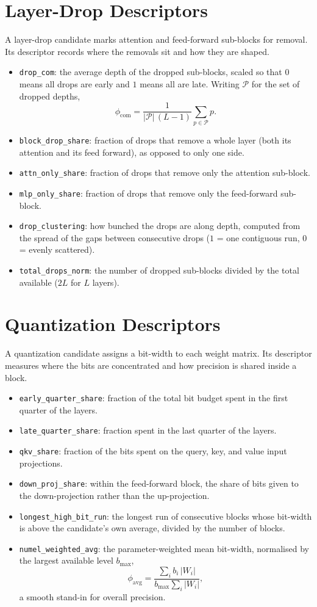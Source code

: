 \documentclass[10pt,twocolumn]{article}
\newcommand{\code}[1]{\texttt{\small #1}}
\begin{document}
\section{Layer-Drop Descriptors}
A layer-drop candidate marks attention and feed-forward sub-blocks for removal. Its descriptor records where the removals sit and how they are shaped.
\begin{itemize}[leftmargin=1.1em,itemsep=1pt,topsep=1pt]
\item \code{drop\_com}: the average depth of the dropped sub-blocks, scaled so that $0$ means all drops are early and $1$ means all are late. Writing $\mathcal{P}$ for the set of dropped depths,
\[
\phi_{\mathrm{com}} = \frac{1}{|\mathcal{P}|\,(L-1)} \sum_{p \in \mathcal{P}} p .
\]
\item \code{block\_drop\_share}: fraction of drops that remove a whole layer (both its attention and its feed forward), as opposed to only one side.
\item \code{attn\_only\_share}: fraction of drops that remove only the attention sub-block.
\item \code{mlp\_only\_share}: fraction of drops that remove only the feed-forward sub-block.
\item \code{drop\_clustering}: how bunched the drops are along depth, computed from the spread of the gaps between consecutive drops ($1$ = one contiguous run, $0$ = evenly scattered).
\item \code{total\_drops\_norm}: the number of dropped sub-blocks divided by the total available ($2L$ for $L$ layers).
\end{itemize}

\section{Quantization Descriptors}
A quantization candidate assigns a bit-width to each weight matrix. Its descriptor measures where the bits are concentrated and how precision is shared inside a block.
\begin{itemize}[leftmargin=1.1em,itemsep=1pt,topsep=1pt]
\item \code{early\_quarter\_share}: fraction of the total bit budget spent in the first quarter of the layers.
\item \code{late\_quarter\_share}: fraction spent in the last quarter of the layers.
\item \code{qkv\_share}: fraction of the bits spent on the query, key, and value input projections.
\item \code{down\_proj\_share}: within the feed-forward block, the share of bits given to the down-projection rather than the up-projection.
\item \code{longest\_high\_bit\_run}: the longest run of consecutive blocks whose bit-width is above the candidate's own average, divided by the number of blocks.
\item \code{numel\_weighted\_avg}: the parameter-weighted mean bit-width, normalised by the largest available level $b_{\max}$,
\[
\phi_{\mathrm{avg}} = \frac{\sum_i b_i\,|W_i|}{b_{\max}\sum_i |W_i|},
\]
a smooth stand-in for overall precision.
\end{itemize}
\end{document}
